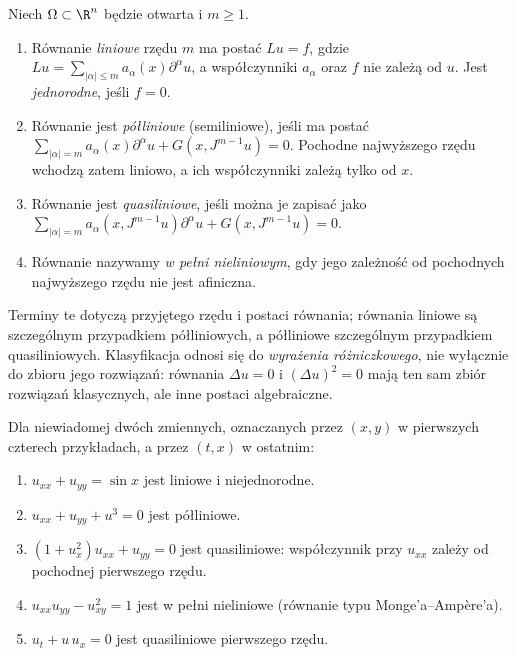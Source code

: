 \begin{definicja}
Niech $\Omega\subset\R^n$ będzie otwarta i $m\geq1$.
\begin{enumerate}
\item Równanie \emph{liniowe} rzędu $m$ ma postać
$Lu=f$, gdzie $Lu=\sum_{|\alpha|\leq m}a_\alpha(x)\partial^\alpha u$,
a współczynniki $a_\alpha$ oraz $f$ nie zależą od $u$.
Jest \emph{jednorodne}, jeśli $f=0$.
\item Równanie jest \emph{półliniowe} (semiliniowe), jeśli ma postać
$\sum_{|\alpha|=m}a_\alpha(x)\partial^\alpha u
+G(x,J^{m-1}u)=0$. Pochodne najwyższego rzędu wchodzą zatem
liniowo, a ich współczynniki zależą tylko od $x$.
\item Równanie jest \emph{quasiliniowe}, jeśli można je zapisać jako
$\sum_{|\alpha|=m}a_\alpha(x,J^{m-1}u)\partial^\alpha u
+G(x,J^{m-1}u)=0$.
\item Równanie nazywamy \emph{w pełni nieliniowym}, gdy jego zależność
od pochodnych najwyższego rzędu nie jest afiniczna.
\end{enumerate}
Terminy te dotyczą przyjętego rzędu i postaci równania; równania
liniowe są szczególnym przypadkiem półliniowych, a półliniowe
szczególnym przypadkiem quasiliniowych. Klasyfikacja odnosi się do
\emph{wyrażenia różniczkowego}, nie wyłącznie do zbioru jego
rozwiązań: równania $\Delta u=0$ i $(\Delta u)^2=0$ mają ten
sam zbiór rozwiązań klasycznych, ale inne postaci algebraiczne.
\end{definicja}

\begin{przyklad}
Dla niewiadomej dwóch zmiennych, oznaczanych przez $(x,y)$
w pierwszych czterech przykładach, a przez $(t,x)$ w ostatnim:
\begin{enumerate}
\item $u_{xx}+u_{yy}=\sin x$ jest liniowe i niejednorodne.
\item $u_{xx}+u_{yy}+u^3=0$ jest półliniowe.
\item $(1+u_x^2)u_{xx}+u_{yy}=0$ jest quasiliniowe: współczynnik
przy $u_{xx}$ zależy od pochodnej pierwszego rzędu.
\item $u_{xx}u_{yy}-u_{xy}^2=1$ jest w pełni nieliniowe
(równanie typu Monge'a--Ampère'a).
\item $u_t+u\,u_x=0$ jest quasiliniowe pierwszego rzędu.
\end{enumerate}
\end{przyklad}


